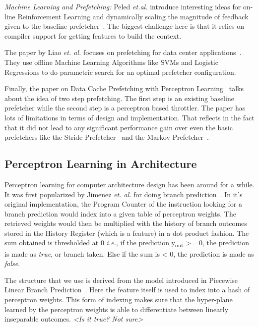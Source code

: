 \textit{Machine Learning and Prefetching:} Peled \textit{et.al.}
introduce interesting ideas for on-line Reinforcement Learning and
dynamically scaling the magnitude of feedback given to the baseline
prefetcher~\cite{Semantics}. The biggest challenge here is that it
relies on compiler support for getting features to build the context.

The paper by Liao \textit{et. al.} focuses on prefetching for data
center applications~\cite{Datacenter}. They use offline Machine
Learning Algorithms like SVMs and Logistic Regressions to do
parametric search for an optimal prefetcher configuration.

Finally, the paper on Data Cache Prefetching with Perceptron
Learning~\cite{BadPerc} talks about the idea of two step prefetching.
The first step is an existing baseline prefetcher while the second
step is a perceptron based throttler.  The paper has lots of
limitations in terms of design and implementation.  That reflects in
the fact that it did not lead to any significant performance gain over
even the basic prefetchers like the Stride Prefetcher~\cite{Stride} and
the Markov Prefetcher~\cite{Markov}.


\subsection{Perceptron Learning in Architecture}
\label{Background-Perceptron}
Perceptron learning for computer architecture design has been around
for a while.  It was first popularized by Jimenez \textit{et. al.} for
doing branch prediction~\cite{Perc_Branch}. In it's original
implementation, the Program Counter of the instruction looking for a
branch prediction would index into a given table of perceptron
weights.  The retrieved weights would then be multiplied with the
history of branch outcomes stored in the History Register (which is a
feature) in a dot product fashion.  The sum obtained is thresholded at
0 \textit{i.e.}, if the prediction y\textsubscript{out} >= 0, the
prediction is made as \textit{true}, or branch taken.  Else if the sum
is < 0, the prediction is made as \textit{false}.

The structure that we use is derived from the model introduced in
Piecewise Linear Branch Prediction~\cite{Piece_Linear}.  Here the
feature itself is used to index into a hash of perceptron weights.
This form of indexing makes sure that the hyper-plane learned by the
perceptron weights is able to differentiate between linearly
inseparable outcomes.  \textit{<Is it true? Not sure>}

